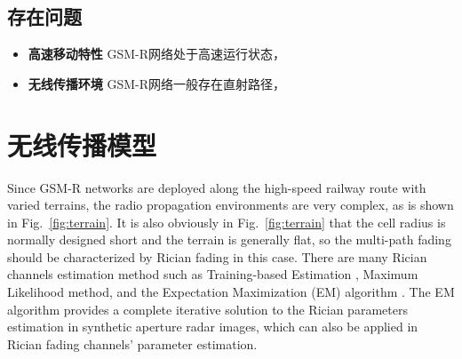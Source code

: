 \subsection{存在问题}
\label{sec:prob3}

\begin{itemize}
  \item \textbf{高速移动特性}
  GSM-R网络处于高速运行状态，
  \item \textbf{无线传播环境}
  GSM-R网络一般存在直射路径，
\end{itemize}


\begin{figure}[!htp]
\centering
    \hspace{1cm}
\end{figure}

\section{无线传播模型}
\label{sec:channelmodel}

Since GSM-R networks are deployed along the high-speed railway route with varied terrains, the radio propagation environments are very complex, as is shown in Fig.~\ref{fig:terrain}. It is also obviously in Fig.~\ref{fig:terrain} that the cell radius is normally designed short and the terrain is generally flat, so the multi-path fading should be characterized by Rician fading in this case. There are many Rician channels estimation method such as Training-based Estimation \cite{bjornson2010framework}, Maximum Likelihood \cite{sijbers1998maximum} method, and the Expectation Maximization (EM) algorithm \cite{marzetta1995algorithm}. The EM algorithm provides a complete iterative solution to the Rician parameters estimation in synthetic aperture radar images, which can also be applied in Rician fading channels' parameter estimation.

